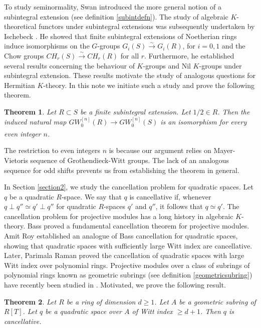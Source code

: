 \documentclass[11pt,a4paper]{amsart}
\theoremstyle{plain}
\newtheorem{thm}{Theorem}[section]
\theoremstyle{definition}
\theoremstyle{remark}
\begin{document}
 
To study seminormality, Swan introduced the more general notion of a subintegral extension (see definition \ref{subintdefn}). The study of algebraic $K$-theoretical functors under subintegral extensions was subsequently undertaken by Ischebeck \cite{ischebeck1989subintegral}. He showed that finite subintegral extensions of Noetherian rings induce isomorphisms on the $G$-groups $G_i(S)\xrightarrow{\sim} G_i(R)$, for $i=0,1$
and the Chow groups $CH_r(S)\xrightarrow{\sim} CH_r(R)$
for all $r$. Furthermore, he established several results concerning the behaviour of $K$-groups and Nil $K$-groups under subintegral extension. These results motivate the study of analogous questions for Hermitian $K$-theory. In this note we initiate such a study and prove the following theorem.
\begin{thm}
     Let $R\subset S$ be a finite subintegral extension. Let $1/2\in R$. Then the induced natural map $GW^{[n]}_0(R)\xrightarrow[]{}GW^{[n]}_0(S)$ is an isomorphism for every even integer $n$.
\end{thm}
The restriction to even integers $n$ is because our argument relies on Mayer-Vietoris sequence of Grothendieck-Witt groups. The lack of an analogous sequence for odd shifts prevents us from establishing the theorem in general.

In Section \ref{section2}, we study the cancellation problem for quadratic spaces. Let $q$ be a quadratic $R$-space. We say that $q$ is cancellative if, whenever $q \perp q'' \simeq q' \perp q''$
for quadratic $R$-spaces $q'$ and $q''$, it follows that $q \simeq q'$.
The cancellation problem for projective modules has a long history in algebraic $K$-theory. Bass \cite{bass1964k} proved a fundamental cancellation theorem for projective modules. Amit Roy established an analogue of Bass cancellation for quadratic spaces, showing that quadratic spaces with sufficiently large Witt index are cancellative. Later, Parimala Raman \cite{parimala1984cancellation} proved the cancellation of quadratic spaces with large Witt index over polynomial rings.
Projective modules over a class of subrings of polynomial rings known as geometric subrings (see definition \ref{geometricsubring}) have recently been studied in \cite{banerjee2024subrings}. Motivated, we prove the following result.

\begin{thm}
    Let $R$ be a ring of dimension $d\geq 1$. Let $A$ be a geometric subring of $R[T]$. Let  $q$ be a quadratic space over $A$ of Witt index $\geq d+1$. Then $q$ is cancellative.  
\end{thm}
\end{document}
